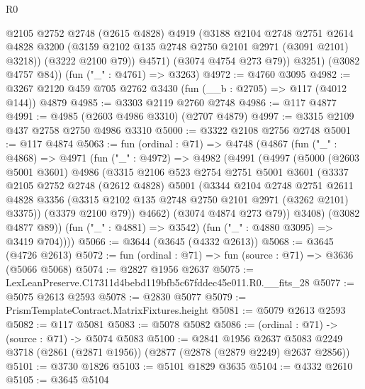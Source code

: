 \begin{lexlean}{R0}
\begin{coremodule}
              @2105
              @2752
              @2748
              (@2615 @4828)
              @4919
              (@3188
                @2104
                @2748
                @2751
                @2614
                @4828
                @3200
                (@3159 @2102 @135 @2748 @2750 @2101 @2971 (@3091 @2101) @3218))
              (@3222 @2100 @79))
            @4571)
          (@3074 @4754 @273 @79))
        @3251)
      (@3082 @4757 @84))
    (fun ("_" : @4761) => @3263)
@4972 := @4760 @3095
@4982 := @3267 @2120 @459 @705 @2762 @3430 (fun (__b : @2705) => @117 (@4012 @144)) @4879
@4985 := @3303 @2119 @2760 @2748
@4986 := @117 @4877
@4991 := @4985 (@2603 @4986 @3310) (@2707 @4879)
@4997 := @3315 @2109 @437 @2758 @2750 @4986 @3310
@5000 := @3322 @2108 @2756 @2748
@5001 := @117 @4874
@5063 := fun (ordinal : @71) =>
  @4748
    (@4867
      (fun ("_" : @4868) =>
      @4971
        (fun ("_" : @4972) =>
        @4982
          (@4991
            (@4997
              (@5000
                (@2603 @5001 @3601)
                @4986
                (@3315
                  @2106
                  @523
                  @2754
                  @2751
                  @5001
                  @3601
                  (@3337
                    @2105
                    @2752
                    @2748
                    (@2612 @4828)
                    @5001
                    (@3344
                      @2104
                      @2748
                      @2751
                      @2611
                      @4828
                      @3356
                      (@3315 @2102 @135 @2748 @2750 @2101 @2971 (@3262 @2101) @3375))
                    (@3379 @2100 @79))
                  @4662)
                (@3074 @4874 @273 @79))
              @3408)
            (@3082 @4877 @89))
          (fun ("_" : @4881) => @3542)
          (fun ("_" : @4880 @3095) => @3419 @704))))
@5066 := @3644 (@3645 (@4332 @2613))
@5068 := @3645 (@4726 @2613)
@5072 := fun (ordinal : @71) => fun (source : @71) => @3636 (@5066 @5068)
@5074 := @2827 @1956 @2637
@5075 := LexLeanPreserve.C17311d4bebd119bfb5c67fddec45e011.R0.__fits_28
@5077 := @5075 @2613 @2593
@5078 := @2830 @5077
@5079 := PrismTemplateContract.MatrixFixtures.height
@5081 := @5079 @2613 @2593
@5082 := @117 @5081
@5083 := @5078 @5082
@5086 := (ordinal : @71) -> (source : @71) -> @5074 @5083
@5100 := @2841
    @1956
    @2637
    @5083
    @2249
    @3718
    (@2861 (@2871 @1956))
    (@2877 (@2878 (@2879 @2249) @2637 @2856))
@5101 := @3730 @1826
@5103 := @5101 @1829 @3635
@5104 := @4332 @2610
@5105 := @3645 @5104

\end{coremodule}
\end{lexlean}
